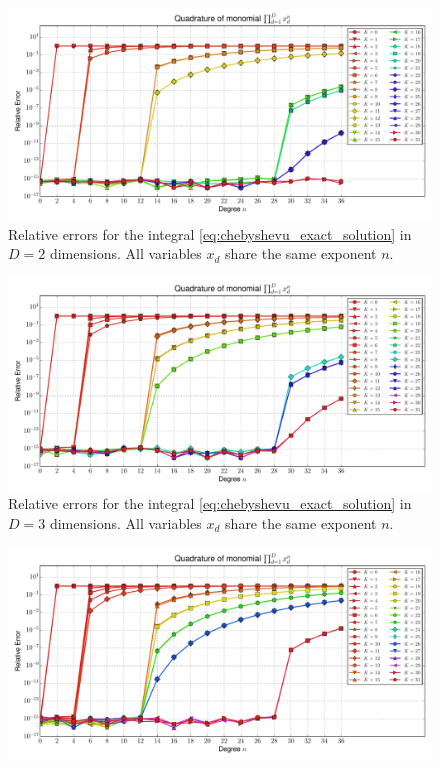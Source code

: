 \documentclass[a4paper,10pt]{article}
\begin{document}
\begin{subfigures}
  \label{fig:monomial_errors_chebyshevu_multivariate}
  \begin{figure}\centering
    \includegraphics[width=\linewidth]{./img/monomial_errors_chebyshevu_multivariate_dimension_2.pdf}
    \caption{Relative errors for the integral \eqref{eq:chebyshevu_exact_solution}
    in $D=2$ dimensions. All variables $x_d$ share the same exponent $n$.}
    \label{fig:monomial_errors_chebyshevu_multivariate_dimension_2}
  \end{figure}
  \begin{figure}\centering
    \includegraphics[width=\linewidth]{./img/monomial_errors_chebyshevu_multivariate_dimension_3.pdf}
    \caption{Relative errors for the integral \eqref{eq:chebyshevu_exact_solution}
    in $D=3$ dimensions. All variables $x_d$ share the same exponent $n$.}
    \label{fig:monomial_errors_chebyshevu_multivariate_dimension_3}
  \end{figure}
  \begin{figure}\centering
    \includegraphics[width=\linewidth]{./img/monomial_errors_chebyshevu_multivariate_dimension_4.pdf}

\end{figure}
\end{subfigures}
\end{document}
